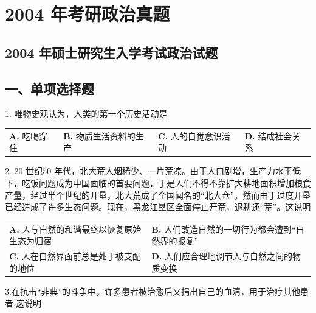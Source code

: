 \documentclass[UTF8,11pt]{ctexart}
\begin{document}
\section*{2004 年考研政治真题}
\subsection*{2004 年硕士研究生入学考试政治试题}

\subsection*{一、单项选择题}

1. 唯物史观认为，人类的第一个历史活动是


\begin{center}\begin{tabular}{>{\raggedright\arraybackslash}p{\dimexpr(\linewidth-8\tabcolsep)/4\relax}>{\raggedright\arraybackslash}p{\dimexpr(\linewidth-8\tabcolsep)/4\relax}>{\raggedright\arraybackslash}p{\dimexpr(\linewidth-8\tabcolsep)/4\relax}>{\raggedright\arraybackslash}p{\dimexpr(\linewidth-8\tabcolsep)/4\relax}}
\textbf{A.} 吃喝穿住 & \textbf{B.} 物质生活资料的生产 & \textbf{C.} 人的自觉意识活动 & \textbf{D.} 结成社会关系\\[.35em]\end{tabular}\end{center}

2. 20 世纪50 年代，北大荒人烟稀少、一片荒凉。由于人口剧增，生产力水平低下，吃饭问题成为中国面临的首要问题，于是人们不得不靠扩大耕地面积增加粮食产量，经过半个世纪的开垦，北大荒成了全国闻名的“北大仓”。然而由于过度开垦已经造成了许多生态问题。现在，黑龙江垦区全面停止开荒，退耕还“荒”。这说明


\begin{center}\begin{tabular}{>{\raggedright\arraybackslash}p{\dimexpr(\linewidth-4\tabcolsep)/2\relax}>{\raggedright\arraybackslash}p{\dimexpr(\linewidth-4\tabcolsep)/2\relax}}
\textbf{A.} 人与自然的和谐最终以恢复原始生态为归宿 & \textbf{B.} 人们改造自然的一切行为都会遭到“自然界的报复”\\[.35em]
\textbf{C.} 人在自然界面前总是处于被支配的地位 & \textbf{D.} 人们应合理地调节人与自然之间的物质变换\\[.35em]\end{tabular}\end{center}

3.在抗击“非典”的斗争中，许多患者被治愈后又捐出自己的血清，用于治疗其他患者,这说明
\end{document}
